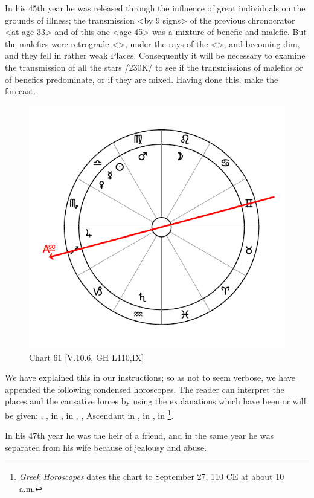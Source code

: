 In his 45th year he was released through the influence of great individuals on the grounds of illness; the transmission <by 9 signs> of the previous chronocrator <at age 33> and of this one <age 45> was a mixture of benefic and malefic. But the malefics were retrograde <\Saturn>, under the rays of the \Sun\xspace <\Mars>, and becoming dim, and they fell in rather weak Places.
Consequently it will be necessary to examine the transmission of all the stars /230K/ to see if the transmissions of malefics or of benefics predominate, or if they are mixed. Having done this, make the forecast. 

\newpage
\begin{figure}
\centering
\vspace{-20pt}
\includegraphics[width=.68\textwidth]{charts/5_10_06}
\caption{Chart 61 [V.10.6, GH L110,IX]}
\label{fig:chart61}
\end{figure}

\noindent We have explained this in our instructions; so as not to seem verbose, we have appended the following condensed horoscopes. The reader can interpret the places and the causative forces by using the explanations which have been or will be given: \Sun, \Mercury, \Venus \xspace in \Libra, \Saturn\xspace in \Aquarius, \Jupiter, Ascendant in \Sagittarius, \Mars\xspace in \Virgo, \Moon in \Leo\footnote{\textit{Greek Horoscopes} dates the chart to September 27, 110 CE at about 10 a.m.}. 

In his 47th year he was the heir of a friend, and in the same year he was separated from his wife because of jealousy and abuse.

